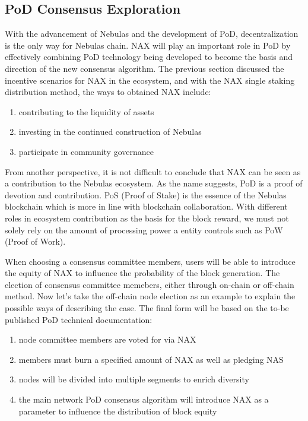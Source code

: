 \subsection{PoD Consensus Exploration}
With the advancement of Nebulas and the development of PoD, decentralization is the only way for Nebulas chain. NAX will play an important role in PoD by effectively combining PoD technology being developed to become the basis and direction of the new consensus algorithm. The previous section discussed the incentive scenarios for NAX in the ecosystem, and with the NAX single staking distribution method, the ways to obtained NAX include:

\begin{enumerate}[\hspace{1cm}(i)]
  \item contributing to the liquidity of assets
  \item investing in the continued construction of Nebulas
  \item participate in community governance
\end{enumerate}

From another perspective, it is not difficult to conclude that NAX can be seen as a contribution to the Nebulas ecosystem. As the name suggests, PoD is a proof of devotion and contribution. PoS (Proof of Stake) is the essence of the Nebulas blockchain which is more in line with blockchain collaboration. With different roles in ecosystem contribution as the basis for the block reward, we must not solely rely on the amount of processing power a entity controls such as PoW (Proof of Work).

When choosing a consensus committee members, users will be able to introduce the equity of NAX to influence the probability of the block generation. The election of consensus committee memebers, either through on-chain or off-chain method. Now let's take the off-chain node election as an example to explain the possible ways of describing the case. The final form will be based on the to-be published PoD technical documentation:

\begin{enumerate}[\hspace{1cm}(a)]
  \item node committee members are voted for via NAX
  \item members must burn a specified amount of NAX as well as pledging NAS
  \item nodes will be divided into multiple segments to enrich diversity
  \item the main network PoD consensus algorithm will introduce NAX as a parameter to influence the distribution of block equity
\end{enumerate}

